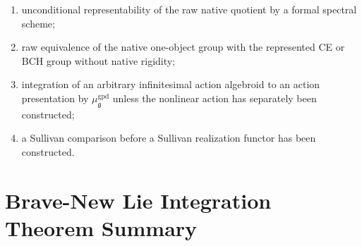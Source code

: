 \begin{enumerate}
    homotopy anchor fibre;
    \item unconditional representability of the raw native quotient by a
    formal spectral scheme;
    \item raw equivalence of the native one-object group with the represented
    CE or BCH group without native rigidity;
    \item integration of an arbitrary infinitesimal action algebroid to an
    action presentation by $\mu^{\mathrm{gpd}}_{\mathfrak g}$ unless the
    nonlinear action has separately been constructed;
    \item a Sullivan comparison before a Sullivan realization functor has been
    constructed.
\end{enumerate}

\section{Brave-New Lie Integration Theorem Summary}
\label{sec:bnli-package}

